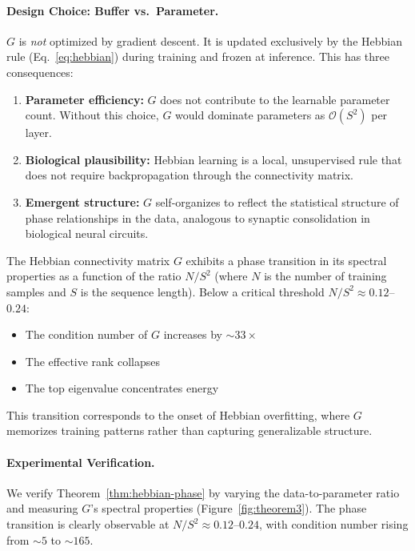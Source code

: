 \paragraph{Design Choice: Buffer vs.\ Parameter.}
$G$ is \emph{not} optimized by gradient descent. It is updated exclusively by the Hebbian rule (Eq.~\eqref{eq:hebbian}) during training and frozen at inference. This has three consequences:
\begin{enumerate}
\item \textbf{Parameter efficiency:} $G$ does not contribute to the learnable parameter count. Without this choice, $G$ would dominate parameters as $\mathcal{O}(S^2)$ per layer.
\item \textbf{Biological plausibility:} Hebbian learning is a local, unsupervised rule that does not require backpropagation through the connectivity matrix.
\item \textbf{Emergent structure:} $G$ self-organizes to reflect the statistical structure of phase relationships in the data, analogous to synaptic consolidation in biological neural circuits.
\end{enumerate}

\begin{theorem}
\label{thm:hebbian-phase}
The Hebbian connectivity matrix $G$ exhibits a phase transition in its spectral properties as a function of the ratio $N/S^2$ (where $N$ is the number of training samples and $S$ is the sequence length). Below a critical threshold $N/S^2 \approx 0.12$--$0.24$:
\begin{itemize}
\item The condition number of $G$ increases by $\sim 33\times$
\item The effective rank collapses
\item The top eigenvalue concentrates energy
\end{itemize}
This transition corresponds to the onset of Hebbian overfitting, where $G$ memorizes training patterns rather than capturing generalizable structure.
\end{theorem}

\paragraph{Experimental Verification.}
We verify Theorem~\ref{thm:hebbian-phase} by varying the data-to-parameter ratio and measuring $G$'s spectral properties (Figure~\ref{fig:theorem3}). The phase transition is clearly observable at $N/S^2 \approx 0.12$--$0.24$, with condition number rising from $\sim 5$ to $\sim 165$.


